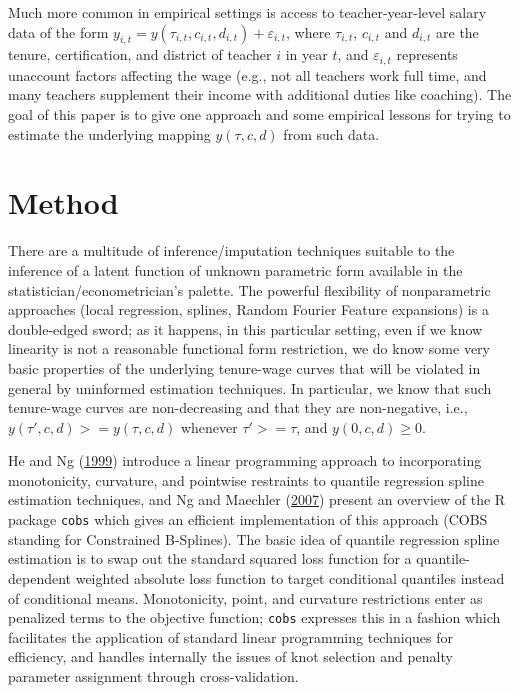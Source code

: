 \documentclass[]{article}
\begin{document}
Much more common in empirical settings is access to teacher-year-level
salary data of the form
\(y_{i, t} = y(\tau_{i, t}, c_{i, t}, d_{i, t}) + \varepsilon_{i, t}\),
where \(\tau_{i,t}\), \(c_{i, t}\) and \(d_{i, t}\) are the tenure,
certification, and district of teacher \(i\) in year \(t\), and
\(\varepsilon_{i, t}\) represents unaccount factors affecting the wage
(e.g., not all teachers work full time, and many teachers supplement
their income with additional duties like coaching). The goal of this
paper is to give one approach and some empirical lessons for trying to
estimate the underlying mapping \(y(\tau, c, d)\) from such data.

\section{Method}\label{method}

There are a multitude of inference/imputation techniques suitable to the
inference of a latent function of unknown parametric form available in
the statistician/econometrician's palette. The powerful flexibility of
nonparametric approaches (local regression, splines, Random Fourier
Feature expansions) is a double-edged sword; as it happens, in this
particular setting, even if we know linearity is not a reasonable
functional form restriction, we do know some very basic properties of
the underlying tenure-wage curves that will be violated in general by
uninformed estimation techniques. In particular, we know that such
tenure-wage curves are non-decreasing and that they are non-negative,
i.e., \(y(\tau', c, d) >= y(\tau, c, d)\) whenever \(\tau' >= \tau\),
and \(y(0, c, d) \geq 0\).

He and Ng (\protect\hyperlink{ref-he}{1999}) introduce a linear
programming approach to incorporating monotonicity, curvature, and
pointwise restraints to quantile regression spline estimation
techniques, and Ng and Maechler (\protect\hyperlink{ref-ng}{2007})
present an overview of the R package \texttt{cobs} which gives an
efficient implementation of this approach (COBS standing for Constrained
B-Splines). The basic idea of quantile regression spline estimation is
to swap out the standard squared loss function for a quantile-dependent
weighted absolute loss function to target conditional quantiles instead
of conditional means. Monotonicity, point, and curvature restrictions
enter as penalized terms to the objective function; \texttt{cobs}
expresses this in a fashion which facilitates the application of
standard linear programming techniques for efficiency, and handles
internally the issues of knot selection and penalty parameter assignment
through cross-validation.
\end{document}
